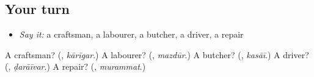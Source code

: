 \subsection*{Your turn}
\begin{itemize}
\raggedright
  \item \emph{Say it:} a craftsman, a labourer, a butcher, a driver, a repair
\end{itemize}

\begin{tcolorbox}[breakable,colback=teal!4,colframe=teal!35!black,title={Before you move on}]
A craftsman? (\textbf{}, \emph{kārīgar}.) A labourer? (\textbf{}, \emph{mazdūr}.) A butcher? (\textbf{}, \emph{kasāī}.) A driver? (\textbf{}, \emph{ḍarāīvar}.) A repair? (\textbf{}, \emph{murammat}.)
\end{tcolorbox}

